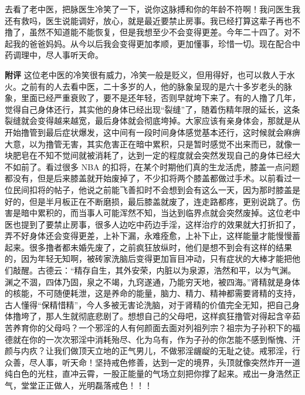 \begin{case}
    去看了老中医，把脉医生冷笑了一下，说你这脉搏和你的年龄不符啊！我问医生我还有救吗，医生说能调好，放心，就是最近要禁止房事。我已经打算这辈子再也不撸了，虽然不知道能不能恢复，但是我想至少不会变得更差。今年二十四了。对不起我的爸爸妈妈。从今以后我会变得更加孝顺，更加懂事，珍惜一切。现在配合中药调理中，尽人事听天命。

    \textbf{附评} 这位老中医的冷笑很有威力，冷笑一般是贬义，但用得好，也可以救人于水火。之前有的人去看中医，二十多岁的人，他的脉象呈现的是六十多岁老头的脉象，里面已经严重衰败了，要不是还年轻，否则早就垮下来了。有的人撸了几年，觉得自己身体还行，其实他的身体已经出现“裂缝”了，随着伤精年限的延长，这条裂缝就会变得越来越宽，最后身体就会彻底垮掉。大家应该有亲身体会，那就是从开始撸管到最后症状爆发，这中间有一段时间身体感觉基本还行，这时候就会麻痹大意，以为撸管无害，其实危害正在暗中累积，只是暂时感觉不出来而已，就像一块肥皂在不知不觉间就被消耗了，达到一定的程度就会突然发现自己的身体已经大不如前了。看过很多 NBA 的扣将，在某个时期他们真的生龙活虎，膝盖一点问题都没有，但是后来膝盖就开始废掉了，不少扣将两个膝盖都做过手术。以前看过一位民间扣将的帖子，他说之前能飞善扣时不会想到会有这么一天，因为那时膝盖是好的，但是半月板正在不断磨损，最后膝盖就废了，连走路都疼，更别说跳了。伤害是暗中累积的，而当事人可能浑然不知，当达到临界点就会突然废掉。这位老中医也提到了要禁止房事，很多人边吃中药边手淫，这样治疗的效果就大打折扣了，弄不好身体还会变得更差，上补下漏，永难痊愈，上补下止，这样能量才能慢慢蓄起来。很多撸者都未婚先废了，之前疯狂放纵时，他们是想不到会有这样的结果的，因为年轻无知啊，被砖家洗脑后变得更加盲目冲动，只有症状的大棒才能把他们敲醒。古德云：“精存自生，其外安荣，内脏以为泉源，浩然和平，以为气渊。渊之不涸，四体乃固，泉之不竭，九窍遂通，乃能穷天地，被四海。”肾精就是身体的核能，不可随便耗泄，这是养命的能量，脑力、精力、精神都需要肾精的支持，古人懂得“保精惜精”，今人多被无害论洗脑，对于肾精的价值完全无知，把自己身体撸垮了，那人生就彻底悲剧了。想想自己的父母吧，这样疯狂撸管对得起含辛茹苦养育你的父母吗？一个邪淫的人有何颜面去面对列祖列宗？祖宗为子孙积下的福德就在你的一次次邪淫中消耗殆尽、化为乌有，作为子孙的你怎能不感到惭愧、汗颜与内疚？让我们做顶天立地的正气男儿，不做邪淫龌龊的无耻之徒。戒邪淫，行众善，尽人事，听天命！坚持戒色修善，达到一定的境界，头顶就像突然炸开一道纯白色的光柱，直冲云霄，一股正能量的气场立刻把你撑了起来。戒出一身浩然正气，堂堂正正做人，光明磊落戒色！！！
\end{case}


